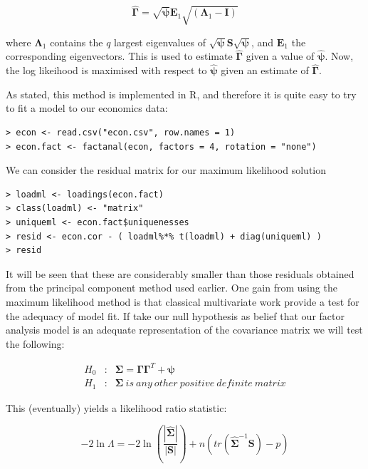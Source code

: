\begin{equation}
\boldsymbol{\hat{\Gamma}} = \sqrt{\boldsymbol{\psi}} \boldsymbol{E}_{1} \sqrt{(\boldsymbol{\Lambda}_{1} - \boldsymbol{I})}
\end{equation}

where $\boldsymbol{\Lambda}_{1}$ contains the $q$ largest eigenvalues of $\sqrt{\boldsymbol{\psi}} \boldsymbol{S} \sqrt{\boldsymbol{\psi}}$, and  $\boldsymbol{E}_{1}$ the corresponding eigenvectors.   This is used to estimate $\boldsymbol{\hat{\Gamma}}$ given a value of $\boldsymbol{\hat{\psi}}$.   Now, the log likeihood is maximised with respect to $\boldsymbol{\hat{\psi}}$ given an estimate of  $\boldsymbol{\hat{\Gamma}}$.

As stated, this method is implemented in R, and therefore it is quite easy to try to fit a model to our economics data:

\singlespacing
\begin{verbatim}
> econ <- read.csv("econ.csv", row.names = 1)
> econ.fact <- factanal(econ, factors = 4, rotation = "none")
\end{verbatim}
\onehalfspacing


We can consider the residual matrix for our maximum likelihood solution

\singlespacing
\begin{verbatim}
> loadml <- loadings(econ.fact)
> class(loadml) <- "matrix"
> uniqueml <- econ.fact$uniquenesses
> resid <- econ.cor - ( loadml%*% t(loadml) + diag(uniqueml) )
> resid
\end{verbatim}
\onehalfspacing

It will be seen that these are considerably smaller than those residuals obtained from the principal component method used earlier.   One gain from using the maximum likelihood method is that classical multivariate work provide a test for the adequacy of model fit.   If take our null hypothesis as belief that our factor analysis model is an adequate representation of the covariance matrix we will test the following:

\begin{eqnarray*}
H_{0}&:& \boldsymbol{\Sigma} = \boldsymbol{\Gamma} \boldsymbol{\Gamma}^{T} + \boldsymbol{\psi}\\
H_{1}&:&  \boldsymbol{\Sigma}\ is\ any\ other\ positive\ definite\ matrix
\end{eqnarray*}

This (eventually) yields a likelihood ratio statistic:

\begin{equation}
-2 \ln \Lambda = -2 \ln \left(  \frac{|\boldsymbol{\hat{\Sigma}}|}{|\boldsymbol{S}|} \right) + n \left( tr(\boldsymbol{\hat{\Sigma}}^{-1}\boldsymbol{S}) - p \right)
\end{equation}

